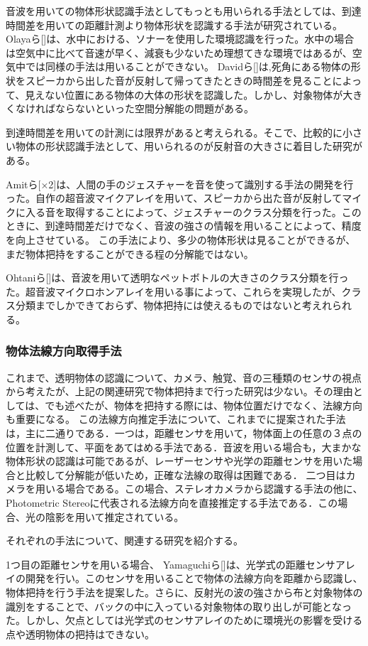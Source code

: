 音波を用いての物体形状認識手法としてもっとも用いられる手法としては、到達時間差を用いての距離計測より物体形状を認識する手法が研究されている。
Olayaら[]は、水中における、ソナーを使用した環境認識を行った。水中の場合は空気中に比べて音速が早く、減衰も少ないため理想てきな環境ではあるが、空気中では同様の手法は用いることができない。
Davidら[]は,死角にある物体の形状をスピーカから出した音が反射して帰ってきたときの時間差を見ることによって、見えない位置にある物体の大体の形状を認識した。しかし、対象物体が大きくなければならないといった空間分解能の問題がある。

到達時間差を用いての計測には限界があると考えられる。そこで、比較的に小さい物体の形状認識手法として、用いられるのが反射音の大きさに着目した研究がある。

Amitら[×2]は、人間の手のジェスチャーを音を使って識別する手法の開発を行った。自作の超音波マイクアレイを用いて、スピーカから出た音が反射してマイクに入る音を取得することによって、ジェスチャーのクラス分類を行った。このときに、到達時間差だけでなく、音波の強さの情報を用いることによって、精度を向上させている。
この手法により、多少の物体形状は見ることができるが、まだ物体把持をすることができる程の分解能ではない。

Ohtaniら[]は、音波を用いて透明なペットボトルの大きさのクラス分類を行った。超音波マイクロホンアレイを用いる事によって、これらを実現したが、クラス分類までしかできておらず、物体把持には使えるものではないと考えれられる。

\subsubsection{物体法線方向取得手法}
これまで、透明物体の認識について、カメラ、触覚、音の三種類のセンサの視点から考えたが、上記の関連研究で物体把持まで行った研究は少ない。その理由としては、でも述べたが、物体を把持する際には、物体位置だけでなく、法線方向も重要になる。
この法線方向推定手法について、これまでに提案された手法は，主に二通りである．一つは，距離センサを用いて，物体面上の任意の３点の位置を計測して、平面をあてはめる手法である．音波を用いる場合も，大まかな物体形状の認識は可能であるが、レーザーセンサや光学の距離センサを用いた場合と比較して分解能が低いため，正確な法線の取得は困難である．
二つ目はカメラを用いる場合である。この場合、ステレオカメラから認識する手法の他に、Photometric Stereoに代表される法線方向を直接推定する手法である．この場合、光の陰影を用いて推定されている。

それぞれの手法について、関連する研究を紹介する。

1つ目の距離センサを用いる場合、
Yamaguchiら[]は、光学式の距離センサアレイの開発を行い。このセンサを用いることで物体の法線方向を距離から認識し、物体把持を行う手法を提案した。さらに、反射光の波の強さから布と対象物体の識別をすることで、バックの中に入っている対象物体の取り出しが可能となった。しかし、欠点としては光学式のセンサアレイのために環境光の影響を受ける点や透明物体の把持はできない。

